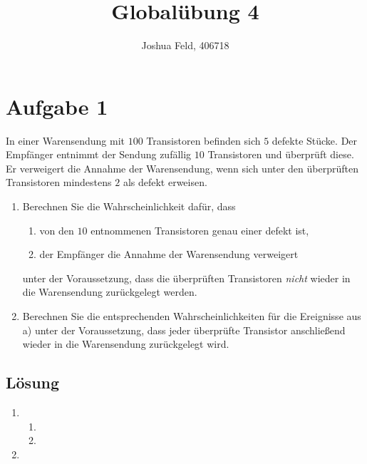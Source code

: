 \documentclass{exercise}
\institute{Institut für Statistik und Wirtschaftsmathematik}
\title{Globalübung 4}
\author{Joshua Feld, 406718}
\begin{document}
    \maketitle


    \section*{Aufgabe 1}

    \begin{problem}
        In einer Warensendung mit \(100\) Transistoren befinden sich \(5\) defekte Stücke.
        Der Empfänger entnimmt der Sendung zufällig \(10\) Transistoren und überprüft diese.
        Er verweigert die Annahme der Warensendung, wenn sich unter den überprüften Transistoren mindestens \(2\) als defekt erweisen.
        \begin{enumerate}
            \item Berechnen Sie die Wahrscheinlichkeit dafür, dass
            \begin{enumerate}
                \item von den \(10\) entnommenen Transistoren genau einer defekt ist,
                \item der Empfänger die Annahme der Warensendung verweigert
            \end{enumerate}
            unter der Voraussetzung, dass die überprüften Transistoren \emph{nicht} wieder in die Warensendung zurückgelegt werden.
            \item Berechnen Sie die entsprechenden Wahrscheinlichkeiten für die Ereignisse aus a) unter der Voraussetzung, dass jeder überprüfte Transistor anschließend wieder in die Warensendung zurückgelegt wird.
        \end{enumerate}
    \end{problem}

    \subsection*{Lösung}
    \begin{enumerate}
        \item
        \begin{enumerate}
            \item
            \item
        \end{enumerate}
        \item
    \end{enumerate}
\end{document}
